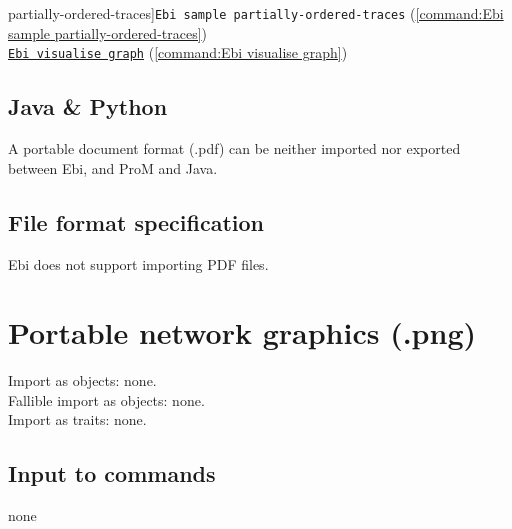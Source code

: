 {partially-ordered-traces]{\texttt{Ebi sample partially-ordered-traces}} (\cref{command:Ebi sample partially-ordered-traces})\\\null\qquad\hyperref[command:Ebi visualise graph]{\texttt{Ebi visualise graph}} (\cref{command:Ebi visualise graph})
\subsection*{Java \& Python}
A portable document format (.pdf) can be neither imported nor exported between Ebi, and ProM and Java.
\subsection*{File format specification}Ebi does not support importing PDF files.
\clearpage
\section{Portable network graphics (.png)}
\label{filehandler:portable network graphics}
Import as objects: none.
\\Fallible import as objects: none.
\\Import as traits: none.
\subsection*{Input to commands} none
}
